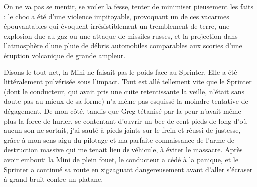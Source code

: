On ne va pas se mentir, se voiler la fesse, tenter de minimiser pieusement les faits : le choc a été d’une violence impitoyable, provoquant un de ces vacarmes épouvantables qui évoquent irrésistiblement un tremblement de terre, une explosion due au gaz ou une attaque de missiles russes, et la projection dans l’atmosphère d’une pluie de débris automobiles comparables aux scories d’une éruption volcanique de grande ampleur.

Disons-le tout net, la Mini ne faisait pas le poids face au Sprinter. Elle a été littéralement pulvérisée sous l’impact. Tout est allé tellement vite que le Sprinter (dont le conducteur, qui avait pris une cuite retentissante la veille, n’était sans doute pas au mieux de sa forme) n’a même pas esquissé la moindre tentative de dégagement. De mon côté, tandis que Greg tétanisé par la peur n’avait même plus la force de hurler, se contentant d’ouvrir un bec de cent pieds de long d’où aucun son ne sortait, j’ai sauté à pieds joints sur le frein et réussi de justesse, grâce à mon sens aigu du pilotage et ma parfaite connaissance de l’arme de destruction massive qui me tenait lieu de véhicule, à éviter le massacre. Après avoir embouti la Mini de plein fouet, le conducteur a cédé à la panique, et le Sprinter a continué sa route en zigzaguant dangereusement avant d’aller s’écraser à grand bruit contre un platane.

